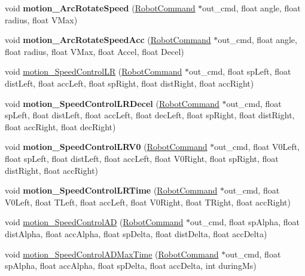 \begin{DoxyCompactItemize}
void {\bfseries motion\+\_\+\+Arc\+Rotate\+Speed} (\hyperlink{structRobotCommand}{Robot\+Command} $\ast$out\+\_\+cmd, float angle, float radius, float V\+Max)
\item 
\mbox{\label{classAsservInsa_ab151cfa4d4b3db98a4fb2a6c8bdccd3f}} 
void {\bfseries motion\+\_\+\+Arc\+Rotate\+Speed\+Acc} (\hyperlink{structRobotCommand}{Robot\+Command} $\ast$out\+\_\+cmd, float angle, float radius, float V\+Max, float Accel, float Decel)
\item 
void \hyperlink{classAsservInsa_ae70a0eb3fe9dab42d6fa1537ddcb6b8b}{motion\+\_\+\+Speed\+Control\+LR} (\hyperlink{structRobotCommand}{Robot\+Command} $\ast$out\+\_\+cmd, float sp\+Left, float dist\+Left, float acc\+Left, float sp\+Right, float dist\+Right, float acc\+Right)
\item 
\mbox{\label{classAsservInsa_a194081c0feee2875b046f2258beebe09}} 
void {\bfseries motion\+\_\+\+Speed\+Control\+L\+R\+Decel} (\hyperlink{structRobotCommand}{Robot\+Command} $\ast$out\+\_\+cmd, float sp\+Left, float dist\+Left, float acc\+Left, float dec\+Left, float sp\+Right, float dist\+Right, float acc\+Right, float dec\+Right)
\item 
\mbox{\label{classAsservInsa_a49676f6697d55466ab9c4219c1c1ac61}} 
void {\bfseries motion\+\_\+\+Speed\+Control\+L\+R\+V0} (\hyperlink{structRobotCommand}{Robot\+Command} $\ast$out\+\_\+cmd, float V0\+Left, float sp\+Left, float dist\+Left, float acc\+Left, float V0\+Right, float sp\+Right, float dist\+Right, float acc\+Right)
\item 
\mbox{\label{classAsservInsa_a6e82f45a33d07b91fbeba56a69b96c2d}} 
void {\bfseries motion\+\_\+\+Speed\+Control\+L\+R\+Time} (\hyperlink{structRobotCommand}{Robot\+Command} $\ast$out\+\_\+cmd, float V0\+Left, float T\+Left, float acc\+Left, float V0\+Right, float T\+Right, float acc\+Right)
\item 
void \hyperlink{classAsservInsa_adeb7a8d4a160f8be0cfecbf721ca2c44}{motion\+\_\+\+Speed\+Control\+AD} (\hyperlink{structRobotCommand}{Robot\+Command} $\ast$out\+\_\+cmd, float sp\+Alpha, float dist\+Alpha, float acc\+Alpha, float sp\+Delta, float dist\+Delta, float acc\+Delta)
\item 
void \hyperlink{classAsservInsa_a949a94fc133abfb6ff87671372a510a8}{motion\+\_\+\+Speed\+Control\+A\+D\+Max\+Time} (\hyperlink{structRobotCommand}{Robot\+Command} $\ast$out\+\_\+cmd, float sp\+Alpha, float acc\+Alpha, float sp\+Delta, float acc\+Delta, int during\+Ms)

\end{DoxyCompactItemize}
